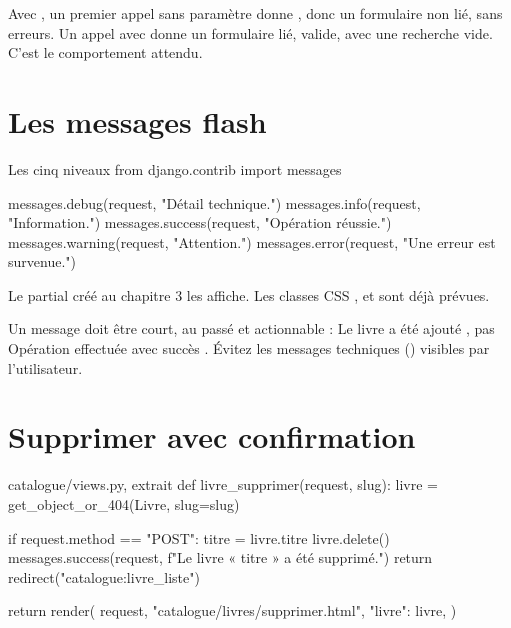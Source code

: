 \begin{note}
Avec , un premier appel sans paramètre donne
, donc un formulaire non lié, sans erreurs. Un appel avec 
donne un formulaire lié, valide, avec une recherche vide. C'est le comportement
attendu.
\end{note}

\section{Les messages flash}

\begin{codebox}[python]{Les cinq niveaux}
from django.contrib import messages

messages.debug(request, "Détail technique.")
messages.info(request, "Information.")
messages.success(request, "Opération réussie.")
messages.warning(request, "Attention.")
messages.error(request, "Une erreur est survenue.")
\end{codebox}

Le partial  créé au chapitre 3 les affiche. Les classes CSS
,  et  sont déjà prévues.

\begin{bonne}
Un message doit être court, au passé et actionnable : \og Le livre a été ajouté \fg,
pas \og Opération effectuée avec succès \fg. Évitez les messages techniques
() visibles par l'utilisateur.
\end{bonne}

\section{Supprimer avec confirmation}

\begin{codebox}[python]{catalogue/views.py, extrait}
def livre_supprimer(request, slug):
    livre = get_object_or_404(Livre, slug=slug)

    if request.method == "POST":
        titre = livre.titre
        livre.delete()
        messages.success(request, f"Le livre « {titre} » a été supprimé.")
        return redirect("catalogue:livre_liste")

    return render(
        request,
        "catalogue/livres/supprimer.html",
        {"livre": livre},
    )
\end{codebox}


